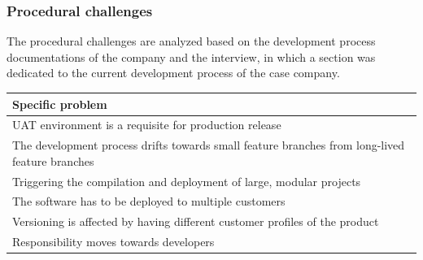 \documentclass[english]{tktltiki2}
\theoremstyle{definition}
\theoremstyle{remark}
\begin{document}




\subsubsection{Procedural challenges}
The procedural challenges are analyzed based on the development process documentations of the company and the interview, in which a section was dedicated to the current development process of the case company. 

\begin{center}
    \begin{tabular}{ | p{12cm} |}
    \hline
    \textbf{Specific problem} \\ \hline
    UAT environment is a requisite for production release \\ \hline
    The development process drifts towards small feature branches from long-lived feature branches \\ \hline
	Triggering the compilation and deployment of large, modular projects \\ \hline
	The software has to be deployed to multiple customers \\ \hline
	Versioning is affected by having different customer profiles of the product \\ \hline
	Responsibility moves towards developers \\
    \hline
    \end{tabular}
\end{center}
\end{document}
